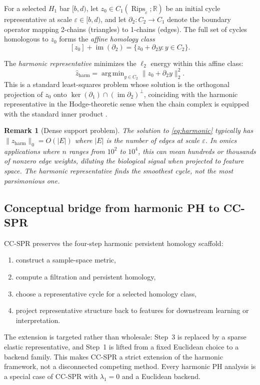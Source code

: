 \documentclass[11pt]{article}
\newtheorem{remark}[theorem]{Remark}
\DeclareMathOperator{\Rips}{Rips}
\DeclareMathOperator*{\argmin}{arg\,min}
\begin{document}
For a selected $H_1$ bar $[b, d)$, let $z_0 \in C_1(\Rips_\varepsilon; \mathbb{R})$ be an initial cycle representative at scale $\varepsilon \in [b, d)$, and let $\partial_2 : C_2 \to C_1$ denote the boundary operator mapping 2-chains (triangles) to 1-chains (edges).
The full set of cycles homologous to $z_0$ forms the \emph{affine homology class}
\begin{equation}\label{eq:affine}
[z_0] + \operatorname{im}(\partial_2) = \{z_0 + \partial_2 y : y \in C_2\}.
\end{equation}

The \emph{harmonic representative} minimizes the $\ell_2$ energy within this affine class:
\begin{equation}\label{eq:harmonic}
\hat{z}_{\mathrm{harm}} = \argmin_{y \in C_2} \| z_0 + \partial_2 y \|_2^2.
\end{equation}
This is a standard least-squares problem whose solution is the orthogonal projection of $z_0$ onto $\ker(\partial_1) \cap (\operatorname{im} \partial_2)^\perp$, coinciding with the harmonic representative in the Hodge-theoretic sense when the chain complex is equipped with the standard inner product \cite{harmonicPH, friedman1998}.

\begin{remark}[Dense support problem]\label{rem:dense}
The solution to \eqref{eq:harmonic} typically has $\|\hat{z}_{\mathrm{harm}}\|_0 = O(|E|)$ where $|E|$ is the number of edges at scale $\varepsilon$.
In omics applications where $n$ ranges from $10^2$ to $10^4$, this can mean hundreds or thousands of nonzero edge weights, diluting the biological signal when projected to feature space.
The harmonic representative finds the smoothest cycle, not the most parsimonious one.
\end{remark}

\subsection{Conceptual bridge from harmonic PH to CC-SPR}

CC-SPR preserves the four-step harmonic persistent homology scaffold:
\begin{enumerate}[leftmargin=1.5em]
\item construct a sample-space metric,
\item compute a filtration and persistent homology,
\item choose a representative cycle for a selected homology class,
\item project representative structure back to features for downstream learning or interpretation.
\end{enumerate}
The extension is targeted rather than wholesale: Step~3 is replaced by a sparse elastic representative, and Step~1 is lifted from a fixed Euclidean choice to a backend family.
This makes CC-SPR a strict extension of the harmonic framework, not a disconnected competing method.
Every harmonic PH analysis is a special case of CC-SPR with $\lambda_1 = 0$ and a Euclidean backend.
\end{document}

